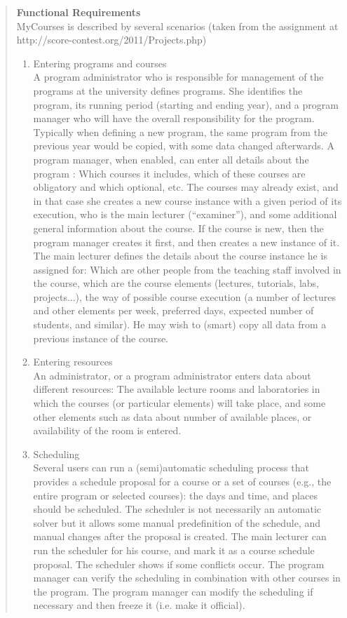 \documentclass{article}
\begin{document}
\begin{quotation}
\textbf{Functional Requirements}\\
MyCourses is described by several scenarios (taken from the assignment at http://score-contest.org/2011/Projects.php)\\[-4mm]
\begin{enumerate}
\item Entering programs and courses \\
A program administrator who is responsible for management of the programs at the university defines programs. She identifies the program, its running period (starting and ending year), and a program manager who will have the overall responsibility for the program. Typically when defining a new program, the same program from the previous year would be copied, with some data changed afterwards. A program manager, when enabled, can enter all details about the program : Which courses it includes, which of these courses are obligatory and which optional, etc. The courses may already exist, and in that case she creates a new course instance with a given period of its execution, who is the main lecturer (``examiner''), and some additional general information about the course. If the course is new, then the program manager creates it first, and then creates a new instance of it.\\
The main lecturer defines the details about the course instance he is assigned for: Which are other people from the teaching staff involved in the course, which are the course elements (lectures, tutorials, labs, projects...), the way of possible course execution (a number of lectures and other elements per week, preferred days, expected number of students, and similar). He may wish to (smart) copy all data from a previous instance of the course.
\item Entering resources \\
An administrator, or a program administrator enters data about different resources: The available lecture rooms and laboratories in which the courses (or particular elements) will take place, and some other elements such as data about number of available places, or availability of the room is entered.
\item Scheduling \\
Several users can run a (semi)automatic scheduling process that provides a schedule proposal for a course or a set of courses (e.g., the entire program or selected courses): the days and time, and places should be scheduled. The scheduler is not necessarily an automatic solver but it allows some manual predefinition of the schedule, and manual changes after the proposal is created. The main lecturer can run the scheduler for his course, and mark it as a course schedule proposal. The scheduler shows if some conflicts occur. The program manager can verify the scheduling in combination with other courses in the program. The program manager can modify the scheduling if necessary and then freeze it (i.e. make it official).

\end{enumerate}
\end{quotation}
\end{document}
